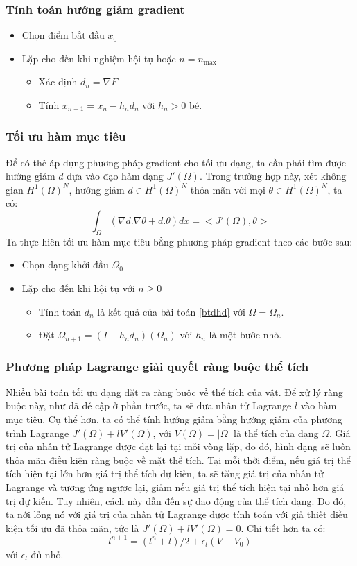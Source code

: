 \documentclass[
12pt, %
oneside, %
english, %
onehalfspacing, %
nolistspacing, %
headsepline, %
addchap,
]{MastersDoctoralThesis} %
\begin{document}
\subsubsection*{Tính toán hướng giảm gradient}
\begin{itemize}
\item Chọn điểm bắt đầu $x_0$
\item Lặp cho đến khi nghiệm hội tụ hoặc $n=n_{\text{max}}$
\begin{itemize}
\item Xác định $d_n = \nabla F$
\item Tính $x_{n+1} = x_n - h_n d_n$ với $h_n > 0$ bé.
\end{itemize}
\end{itemize}
\subsubsection*{Tối ưu hàm mục tiêu}
Để có thẻ áp dụng phương pháp gradient cho tối ưu dạng, ta cần phải tìm được hướng giảm $d$ dựa vào đạo hàm dạng $J'(\Omega)$. Trong trường hợp này, xét không gian $H^1(\Omega)^N$, hướng giảm $d \in H^1(\Omega)^N$ thỏa mãn với mọi $\theta \in H^1(\Omega)^N$, ta có:
\begin{equation}\label{btdhd}
\int_\Omega (\nabla d.\nabla \theta + d.\theta)dx=<J'(\Omega),\theta>
\end{equation}
Ta thực hiên tối ưu hàm mục tiêu bằng phương pháp gradient theo các bước sau:
\begin{itemize}
\item Chọn dạng khởi đầu $\Omega_0$
\item Lặp cho đến khi hội tụ với $n\geq 0$
\begin{itemize}
\item Tính toán $d_n$ là kết quả của bài toán \ref{btdhd} với $\Omega = \Omega_n$.
\item Đặt $\Omega_{n+1} = (I-h_n d_n)(\Omega_n)$ với $h_n$ là một bước nhỏ.
\end{itemize}
\end{itemize}
\subsubsection*{Phương pháp Lagrange giải quyết ràng buộc thể tích}
Nhiều bài toán tối ưu dạng đặt ra ràng buộc về thể tích của vật. Để xử lý ràng buộc này, như đã đề cập ở phần trước, ta sẽ đưa nhân tử Lagrange $l$ vào hàm mục tiêu. Cụ thể hơn, ta có thể tính hướng giảm bằng hướng giảm của phương trình Lagrange $J'(\Omega) + lV'(\Omega)$, với $V(\Omega) = |\Omega|$ là thể tích của dạng $\Omega$. Giá trị của nhân tử Lagrange được đặt lại tại mỗi vòng lặp, do đó, hình dạng sẽ luôn thỏa mãn điều kiện ràng buộc về mặt thể tích. Tại mỗi thời điểm, nếu giá trị thể tích hiện tại lớn hơn giá trị thể tích dự kiến, ta sẽ tăng giá trị của nhân tử Lagrange và tương ứng ngược lại, giảm nếu giá trị thể tích hiện tại nhỏ hơn giá trị dự kiến. Tuy nhiên, cách này dẫn đến sự dao động của thể tích dạng. Do đó, ta nới lỏng nó với giá trị của nhân tử Lagrange được tính toán với giả thiết điều kiện tối ưu đã thỏa mãn, tức là $J'(\Omega) + lV'(\Omega) = 0$. Chi tiết hơn ta có:
$$l^{n+1}=(l^n+l)/2 + \epsilon_l(V-V_0)$$
với $\epsilon_l$ đủ nhỏ.
\end{document}
